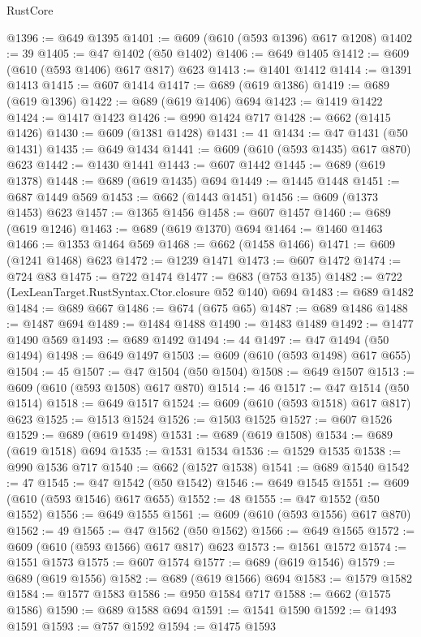 \begin{lexlean}{RustCore}
\begin{coremodule}
@1396 := @649 @1395
@1401 := @609 (@610 (@593 @1396) @617 @1208)
@1402 := 39
@1405 := @47 @1402 (@50 @1402)
@1406 := @649 @1405
@1412 := @609 (@610 (@593 @1406) @617 @817) @623
@1413 := @1401 @1412
@1414 := @1391 @1413
@1415 := @607 @1414
@1417 := @689 (@619 @1386)
@1419 := @689 (@619 @1396)
@1422 := @689 (@619 @1406) @694
@1423 := @1419 @1422
@1424 := @1417 @1423
@1426 := @990 @1424 @717
@1428 := @662 (@1415 @1426)
@1430 := @609 (@1381 @1428)
@1431 := 41
@1434 := @47 @1431 (@50 @1431)
@1435 := @649 @1434
@1441 := @609 (@610 (@593 @1435) @617 @870) @623
@1442 := @1430 @1441
@1443 := @607 @1442
@1445 := @689 (@619 @1378)
@1448 := @689 (@619 @1435) @694
@1449 := @1445 @1448
@1451 := @687 @1449 @569
@1453 := @662 (@1443 @1451)
@1456 := @609 (@1373 @1453) @623
@1457 := @1365 @1456
@1458 := @607 @1457
@1460 := @689 (@619 @1246)
@1463 := @689 (@619 @1370) @694
@1464 := @1460 @1463
@1466 := @1353 @1464 @569
@1468 := @662 (@1458 @1466)
@1471 := @609 (@1241 @1468) @623
@1472 := @1239 @1471
@1473 := @607 @1472
@1474 := @724 @83
@1475 := @722 @1474
@1477 := @683 (@753 @135)
@1482 := @722 (LexLeanTarget.RustSyntax.Ctor.closure @52 @140) @694
@1483 := @689 @1482
@1484 := @689 @667
@1486 := @674 (@675 @65)
@1487 := @689 @1486
@1488 := @1487 @694
@1489 := @1484 @1488
@1490 := @1483 @1489
@1492 := @1477 @1490 @569
@1493 := @689 @1492
@1494 := 44
@1497 := @47 @1494 (@50 @1494)
@1498 := @649 @1497
@1503 := @609 (@610 (@593 @1498) @617 @655)
@1504 := 45
@1507 := @47 @1504 (@50 @1504)
@1508 := @649 @1507
@1513 := @609 (@610 (@593 @1508) @617 @870)
@1514 := 46
@1517 := @47 @1514 (@50 @1514)
@1518 := @649 @1517
@1524 := @609 (@610 (@593 @1518) @617 @817) @623
@1525 := @1513 @1524
@1526 := @1503 @1525
@1527 := @607 @1526
@1529 := @689 (@619 @1498)
@1531 := @689 (@619 @1508)
@1534 := @689 (@619 @1518) @694
@1535 := @1531 @1534
@1536 := @1529 @1535
@1538 := @990 @1536 @717
@1540 := @662 (@1527 @1538)
@1541 := @689 @1540
@1542 := 47
@1545 := @47 @1542 (@50 @1542)
@1546 := @649 @1545
@1551 := @609 (@610 (@593 @1546) @617 @655)
@1552 := 48
@1555 := @47 @1552 (@50 @1552)
@1556 := @649 @1555
@1561 := @609 (@610 (@593 @1556) @617 @870)
@1562 := 49
@1565 := @47 @1562 (@50 @1562)
@1566 := @649 @1565
@1572 := @609 (@610 (@593 @1566) @617 @817) @623
@1573 := @1561 @1572
@1574 := @1551 @1573
@1575 := @607 @1574
@1577 := @689 (@619 @1546)
@1579 := @689 (@619 @1556)
@1582 := @689 (@619 @1566) @694
@1583 := @1579 @1582
@1584 := @1577 @1583
@1586 := @950 @1584 @717
@1588 := @662 (@1575 @1586)
@1590 := @689 @1588 @694
@1591 := @1541 @1590
@1592 := @1493 @1591
@1593 := @757 @1592
@1594 := @1475 @1593

\end{coremodule}
\end{lexlean}
